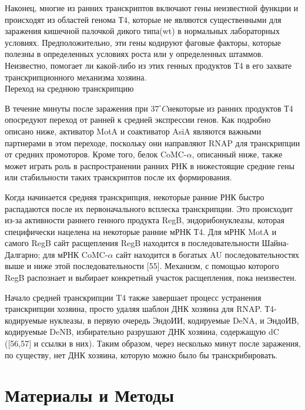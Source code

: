 \documentclass[a4paper,12pt]{article}
\begin{document}
            \par{Наконец, многие из ранних транскриптов включают гены неизвестной функции и происходят из областей генома Т4, которые не являются существенными для заражения кишечной палочкой дикого типа(wt) в нормальных лабораторных условиях. Предположительно, эти гены кодируют фаговые факторы, которые полезны в определенных условиях роста или у определенных штаммов. Неизвестно, помогает ли какой-либо из этих генных продуктов Т4 в его захвате транскрипционного механизма хозяина.} \\
        {\Large Переход на среднюю транскрипцию}
            \par{В течение минуты после заражения при $ 37^{\circ}C $некоторые из ранних продуктов Т4 опосредуют переход
            от ранней к средней экспрессии генов. Как подробно описано ниже, активатор MotA и соактиватор AsiA являются
            важными партнерами в этом переходе, поскольку они направляют RNAP для транскрипции от средних промоторов.
            Кроме того, белок CoMC-$\alpha$, описанный ниже, также может играть роль в распространении ранних РНК в
            нижестоящие средние гены или стабильности таких транскриптов после их формирования.}
            \par{Когда начинается средняя транскрипция, некоторые ранние РНК быстро распадаются после их первоначального
            всплеска транскрипции. Это происходит из-за активности раннего генного продукта RegB, эндорибонуклеазы,
            которая специфически нацелена на некоторые ранние мРНК Т4. Для мРНК MotA и самого RegB сайт расщепления RegB
            находится в последовательности Шайна-Далгарно; для мРНК CoMC-$\alpha$ сайт находится в богатых AU
            последовательностях выше и ниже этой последовательности [55]. Механизм, с помощью которого RegB распознает и
            выбирает конкретный участок расщепления, пока неизвестен.}
            \par{Начало средней транскрипции T4 также завершает процесс устранения транскрипции хозяина, просто удаляя
            шаблон ДНК хозяина для RNAP. Т4-кодируемые нуклеазы, в первую очередь ЭндоИИ, кодируемые DeNA, и ЭндоИВ,
            кодируемые DeNB, избирательно разрушают ДНК хозяина, содержащую dC ([56,57] и ссылки в них). Таким образом,
            через несколько минут после заражения, по существу, нет ДНК хозяина, которую можно было бы транскрибировать.}

\newpage
\section{Материалы и Методы} \label{sec:code}
\end{document}
